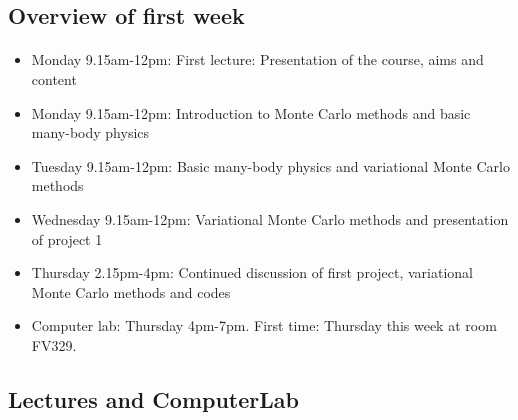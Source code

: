 \documentclass[%
twoside,                 %
final,                   %
10pt]{article}
\begin{document}
\noindent





\subsection{Overview of first week}


\paragraph{}
\begin{itemize}
  \item Monday 9.15am-12pm: First lecture: Presentation of the course, aims and content

  \item Monday 9.15am-12pm: Introduction to Monte Carlo methods and basic many-body physics

  \item Tuesday 9.15am-12pm: Basic many-body physics and variational Monte Carlo methods

  \item Wednesday 9.15am-12pm: Variational Monte Carlo methods and presentation of project 1

  \item Thursday 2.15pm-4pm: Continued discussion of first project, variational Monte Carlo methods and codes

  \item Computer lab: Thursday 4pm-7pm. First time: Thursday this week at room FV329.
\end{itemize}

\noindent



\subsection{Lectures and ComputerLab}


\end{document}
